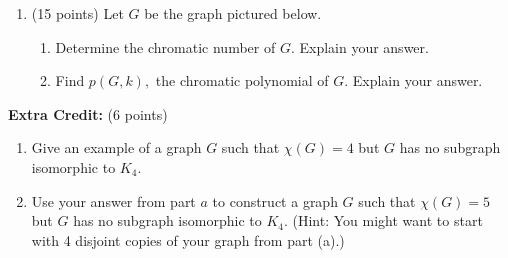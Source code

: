 \documentclass[11pt]{article}
\newcommand{\vertex}{\node[vertex]}
\begin{document}
\begin{enumerate}
\vfill

\item (15 points) Let $G$ be the graph pictured below.\\
	\begin{enumerate}
	\item Determine the chromatic  number of $G$. Explain your answer.\\
	
	\item Find $p(G,k),$  the chromatic polynomial of $G$. Explain your answer. \\
	\end{enumerate}
\end{enumerate}	
\textbf{Extra Credit:} (6 points) 
\begin{enumerate}
	\item Give an example of a graph $G$ such that $\chi(G)=4$ but $G$ has no subgraph isomorphic to $K_4.$\\
	
	\item Use your answer from part $a$ to construct a graph $G$ such that $\chi(G)=5$ but $G$ has no subgraph isomorphic to $K_4.$ (Hint: You might want to start with 4 disjoint copies of your graph from part (a).)\\
		
\end{enumerate}
\vfill
\end{document}
